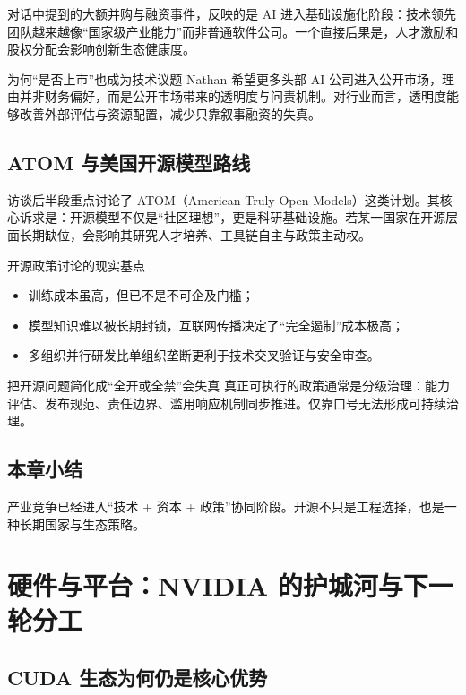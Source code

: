 \documentclass[a4paper]{article}
\begin{document}
对话中提到的大额并购与融资事件，反映的是 AI 进入基础设施化阶段：技术领先团队越来越像“国家级产业能力”而非普通软件公司。一个直接后果是，人才激励和股权分配会影响创新生态健康度。

\begin{knowledgebox}{为何“是否上市”也成为技术议题}
Nathan 希望更多头部 AI 公司进入公开市场，理由并非财务偏好，而是公开市场带来的透明度与问责机制。对行业而言，透明度能够改善外部评估与资源配置，减少只靠叙事融资的失真。
\end{knowledgebox}

\subsection{ATOM 与美国开源模型路线}

访谈后半段重点讨论了 ATOM（American Truly Open Models）这类计划。其核心诉求是：开源模型不仅是“社区理想”，更是科研基础设施。若某一国家在开源层面长期缺位，会影响其研究人才培养、工具链自主与政策主动权。

\begin{importantbox}{开源政策讨论的现实基点}
\begin{itemize}[leftmargin=1.5em]
    \item 训练成本虽高，但已不是不可企及门槛；
    \item 模型知识难以被长期封锁，互联网传播决定了“完全遏制”成本极高；
    \item 多组织并行研发比单组织垄断更利于技术交叉验证与安全审查。
\end{itemize}
\end{importantbox}

\begin{warningbox}{把开源问题简化成“全开或全禁”会失真}
真正可执行的政策通常是分级治理：能力评估、发布规范、责任边界、滥用响应机制同步推进。仅靠口号无法形成可持续治理。
\end{warningbox}

\subsection{本章小结}

产业竞争已经进入“技术 + 资本 + 政策”协同阶段。开源不只是工程选择，也是一种长期国家与生态策略。

\section{硬件与平台：NVIDIA 的护城河与下一轮分工}

\subsection{CUDA 生态为何仍是核心优势}
\end{document}
